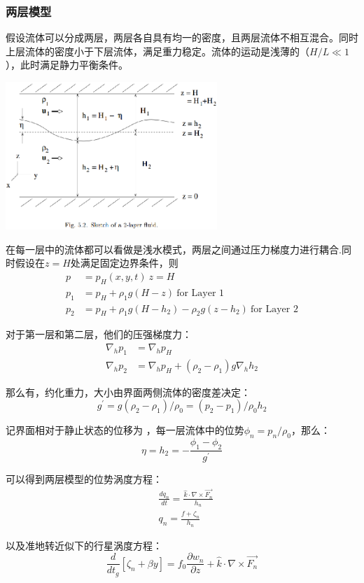 \documentclass{article}
\begin{document}
\subsubsection{两层模型}
假设流体可以分成两层，两层各自具有均一的密度，且两层流体不相互混合。同时上层流体的密度小于下层流体，满足重力稳定。流体的运动是浅薄的（$H/L \ll 1$），此时满足静力平衡条件。

\begin{center}
\includegraphics[width=8cm]{Fig4_1.png}
\end{center}

在每一层中的流体都可以看做是浅水模式，两层之间通过压力梯度力进行耦合.同时假设在$z=H$处满足固定边界条件，则
\begin{align}
p&=p_H(x,y,t) \ z=H \\
p_1&=p_H + \rho_1 g(H-z)  \ \text{for Layer 1} \\
p_2&=p_H + \rho_1 g(H-h_2) - \rho_2 g(z-h_2)  \ \text{for Layer 2}
\end{align}

对于第一层和第二层，他们的压强梯度力：
\begin{align}
\nabla_h p_1 &= \nabla_h p_H \\
\nabla_h p_2 &= \nabla_h p_H + (\rho_2-\rho_1)g\nabla_hh_2 
\end{align}

那么有，约化重力，大小由界面两侧流体的密度差决定：
$$g^{\prime} = g(\rho_2-\rho_1)/\rho_0 = (p_2-p_1)/\rho_0h_2$$

记界面相对于静止状态的位移为 ，每一层流体中的位势$\phi_n=p_n/\rho_0$，那么：
$$\eta=h_2=-\frac{\phi_1-\phi_2}{g^{\prime}}$$

可以得到两层模型的位势涡度方程：
\begin{align}
&\frac{dq_n}{dt}=\frac{\hat{k}\cdot\nabla\times\vec{F_n}}{h_n}\\
&q_n=\frac{f+\zeta_n}{h_n}   
\end{align}

以及准地转近似下的行星涡度方程：
$$\frac{d}{dt_g}[\zeta_n+\beta y]=f_0\frac{\partial w_n}{\partial z}+\hat{k}\cdot\nabla\times\vec{F_n}$$
\end{document}
